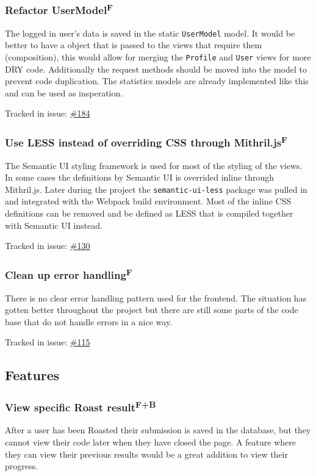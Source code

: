 \documentclass[12pt,a4paper]{report}
\begin{document}
\subsubsection{Refactor UserModel\texorpdfstring{\textsuperscript{F}}{}}
The logged in user's data is saved in the static \texttt{UserModel} model. It would be better to have a object that is passed to the views that require them (composition), this would allow for merging the \texttt{Profile} and \texttt{User} views for more DRY code. Additionally the request methods should be moved into the model to prevent code duplication. The statistics models are already implemented like this and can be used as insperation.

Tracked in issue: \href{https://github.com/LuleaUniversityOfTechnology/2018-project-roaster/issues/184}{\#184}

\subsubsection{Use LESS instead of overriding CSS through Mithril.js\texorpdfstring{\textsuperscript{F}}{}}
The Semantic UI styling framework is used for most of the styling of the views. In some cases the definitions by Semantic UI is overrided inline through Mithril.js. Later during the project the \texttt{semantic-ui-less} package was pulled in and integrated with the Webpack build environment. Most of the inline CSS definitions can be removed and be defined as LESS that is compiled together with Semantic UI instead.

Tracked in issue: \href{https://github.com/LuleaUniversityOfTechnology/2018-project-roaster/issues/130}{\#130}

\subsubsection{Clean up error handling\texorpdfstring{\textsuperscript{F}}{}}
There is no clear error handling pattern used for the frontend. The situation has gotten better throughout the project but there are still some parts of the code base that do not handle errors in a nice way.

Tracked in issue: \href{https://github.com/LuleaUniversityOfTechnology/2018-project-roaster/issues/115}{\#115}

\subsection*{Features}
\subsubsection{View specific Roast result\texorpdfstring{\textsuperscript{F+B}}{}}
After a user has been Roasted their submission is saved in the database, but they cannot view their code later when they have closed the page. A feature where they can view their previous results would be a great addition to view their progress.
\end{document}
